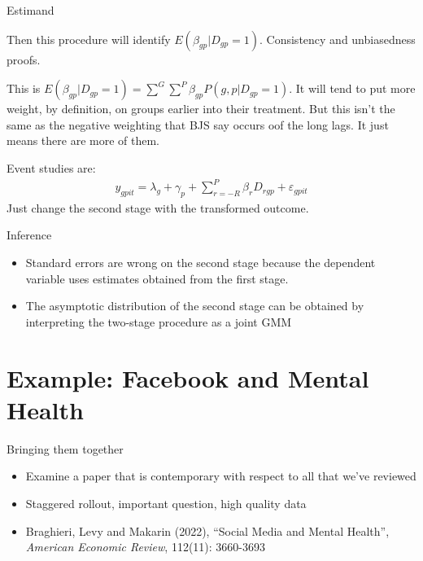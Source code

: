 \documentclass{beamer}
\begin{document}
\begin{frame}{Estimand}

Then this procedure will identify $E(\beta_{gp} | D_{gp}=1)$. Consistency and unbiasedness proofs. 

\bigskip

This is $E(\beta_{gp}|D_{gp}=1) = \sum^G \sum^P \beta_{gp} P(g,p|D_{gp}=1)$. It will tend to put more weight, by definition, on groups earlier into their treatment.  But this isn't the same as the negative weighting that BJS say occurs oof the long lags.  It just means there are more of them.

\bigskip

Event studies are:
\begin{eqnarray*}
y_{gpit} = \lambda_g + \gamma_p + \sum_{r=-R}^P \beta_rD_{rgp} + \varepsilon_{gpit}
\end{eqnarray*}Just change the second stage with the transformed outcome. 

\end{frame}

\begin{frame}{Inference}

\begin{itemize}
\item Standard errors are wrong on the second stage because the dependent variable uses estimates obtained from the first stage. 
\item The asymptotic distribution of the second stage can be obtained by interpreting the two-stage procedure as a joint GMM
\end{itemize}

\end{frame}

\section{Example: Facebook and Mental Health}

\begin{frame}{Bringing them together}

\begin{itemize}

\item Examine a paper that is contemporary with respect to all that we've reviewed
\item Staggered rollout, important question, high quality data
\item Braghieri, Levy and Makarin (2022), ``Social Media and Mental Health'', \emph{American Economic Review}, 112(11): 3660-3693

\end{itemize}

\end{frame}
\end{document}
